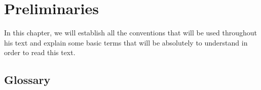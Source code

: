 \begin{comment}
  
\end{comment}

\chapter{Preliminaries}
\label{cha:preliminaries}

In this chapter, we will establish all the conventions that will be used
throughout his text and explain some basic terms that will be
absolutely to understand in order to read this text.

\section{Glossary}
\label{sec:glossary}

